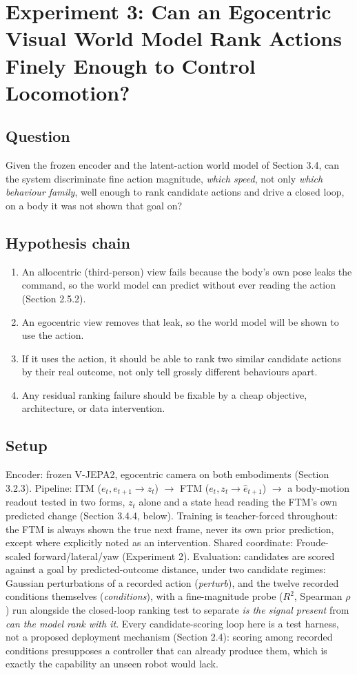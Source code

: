 \documentclass[12pt,a4paper,oneside]{report}
\begin{document}
\section{Experiment 3: Can an Egocentric Visual World Model Rank Actions Finely Enough to Control Locomotion?}

\subsection{Question}
Given the frozen encoder and the latent-action world model of Section 3.4, can the system discriminate fine
action magnitude, \emph{which speed}, not only \emph{which behaviour family}, well enough to rank candidate
actions and drive a closed loop, on a body it was not shown that goal on?

\subsection{Hypothesis chain}
\begin{enumerate}[label=\arabic*.]
\item An allocentric (third-person) view fails because the body's own pose leaks the command, so the world
  model can predict without ever reading the action (Section 2.5.2).
\item An egocentric view removes that leak, so the world model will be shown to use the action.
\item If it uses the action, it should be able to rank two similar candidate actions by their real outcome, not
  only tell grossly different behaviours apart.
\item Any residual ranking failure should be fixable by a cheap objective, architecture, or data intervention.
\end{enumerate}

\subsection{Setup}
Encoder: frozen V-JEPA2, egocentric camera on both embodiments (Section 3.2.3). Pipeline: ITM ($e_t, e_{t+1} \to
z_t$) $\to$ FTM ($e_t, z_t \to \hat{e}_{t+1}$) $\to$ a body-motion readout tested in two forms, $z_t$ alone and a
state head reading the FTM's own predicted change (Section 3.4.4, below). Training is
teacher-forced throughout: the FTM is always shown the true next frame, never its own prior prediction, except
where explicitly noted as an intervention. Shared coordinate: Froude-scaled forward/lateral/yaw (Experiment 2).
Evaluation: candidates are scored against a goal by predicted-outcome distance, under two candidate regimes:
Gaussian perturbations of a recorded action (\emph{perturb}), and the twelve recorded conditions themselves
(\emph{conditions}), with a fine-magnitude probe ($R^2$, Spearman $\rho$) run alongside the closed-loop ranking
test to separate \emph{is the signal present} from \emph{can the model rank with it}. Every candidate-scoring
loop here is a test harness, not a proposed deployment mechanism (Section 2.4): scoring among recorded conditions
presupposes a controller that can already produce them, which is exactly the capability an unseen robot would
lack.
\end{document}
